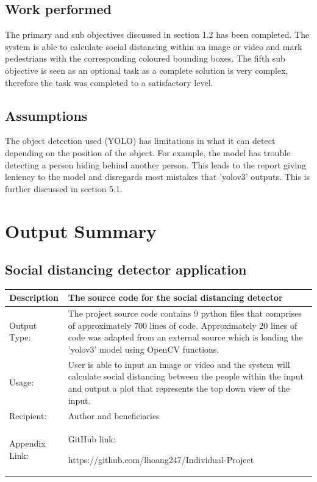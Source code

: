 \documentclass[12pt]{report}
\begin{document}
\section{Work performed}

The primary and sub objectives discussed in section 1.2 has been completed. The system is able to calculate social distancing within an image or video and mark pedestrians with the corresponding coloured bounding boxes. The fifth sub objective is seen as an optional task as a complete solution is very complex, therefore the task was completed to a satisfactory level.


\section{Assumptions}

The object detection used (YOLO) has limitations in what it can detect depending on the position of the object. For example, the model has trouble detecting a person hiding behind another person. This leads to the report giving leniency to the model and disregards most mistakes that 'yolov3' outputs. This is further discussed in section 5.1.

\chapter{Output Summary}

\section{Social distancing detector application}

\begin{tabular}{|p{2.2cm}|p{11cm}|}
	\hline
	Description & The source code for the social distancing detector\\
	\hline
	Output Type: & The project source code contains 9 python files that comprises of approximately 700 lines of code. Approximately 20 lines of code was adapted from an external source which is loading the 'yolov3' model using OpenCV functions.  \\
	\hline
	Usage: & User is able to input an image or video and the system will calculate social distancing between the people within the input and output a plot that represents the top down view of the input. \\
	\hline
	Recipient: & Author and beneficiaries \\
	\hline
	Appendix Link: & GitHub link: 
	
	https://github.com/lhoang247/Individual-Project \\
	\hline
\end{tabular}
\end{document}
